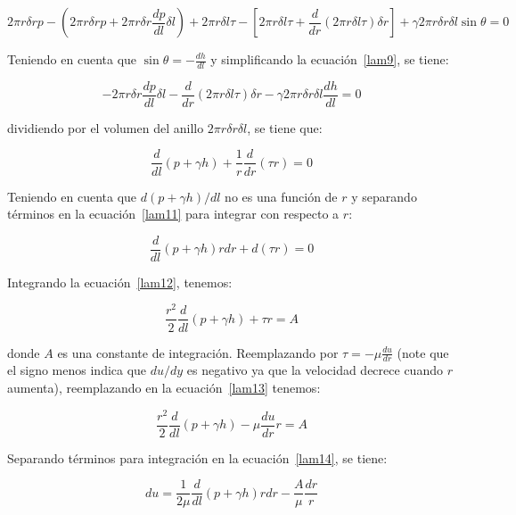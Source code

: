 \documentclass[11pt, oneside]{article}
\begin{document}
\begin{equation}
2\pi r \delta r p -\left( 2\pi r \delta r p + 2\pi r \delta r \frac{dp}{dl} \delta l \right ) + 2\pi r \delta l \tau - \left[ 2\pi r \delta l \tau + \frac{d}{dr}(2\pi r \delta l \tau) \delta r \right] + \gamma 2 \pi r \delta r \delta l \sin \theta = 0  
\label{lam9}
\end{equation}

Teniendo en cuenta que $\sin \theta = -\frac{dh}{dl}$ y simplificando  la ecuaci\'on~\ref{lam9}, se tiene:

\begin{equation}
- 2\pi r \delta r \frac{dp}{dl} \delta l  - \frac{d}{dr}(2\pi r \delta l \tau) \delta r  - \gamma 2 \pi r \delta r \delta l \frac{dh}{dl} = 0  
\label{lam10}
\end{equation}

dividiendo por el volumen del anillo $2\pi r\delta r \delta l$, se tiene que:

\begin{equation}
\frac{d}{dl}(p + \gamma h) + \frac{1}{r}\frac{d}{dr}(\tau r) = 0
\label{lam11}
\end{equation}

Teniendo en cuenta que $d(p + \gamma h)/dl$ no es una funci\'on de $r$ y separando t\'erminos en la ecuaci\'on~\ref{lam11} para integrar con respecto a $r$:

\begin{equation}
\frac{d}{dl}(p + \gamma h) r dr + d(\tau r ) = 0
\label{lam12}
\end{equation}

Integrando la ecuaci\'on~\ref{lam12}, tenemos:
 
\begin{equation}
\frac{r^2}{2}\frac{d}{dl}(p + \gamma h) + \tau r = A
\label{lam13}
\end{equation}

donde $A$ es una constante de integraci\'on. Reemplazando por $\tau = - \mu \frac{du}{dr}$ (note que el signo menos indica que $du/dy$ es negativo ya que la velocidad decrece cuando $r$ aumenta), reemplazando en la ecuaci\'on~\ref{lam13} tenemos:

\begin{equation}
\frac{r^2}{2}\frac{d}{dl}(p + \gamma h) -\mu \frac{du}{dr} r = A
\label{lam14}
\end{equation}

Separando t\'erminos para integraci\'on en la ecuaci\'on~\ref{lam14}, se tiene:

\begin{equation}
du = \frac{1}{2\mu} \frac{d}{dl}(p + \gamma h) r dr -\frac{A}{\mu}\frac{dr}{r}
\label{lam15}
\end{equation}
 
\end{document}

